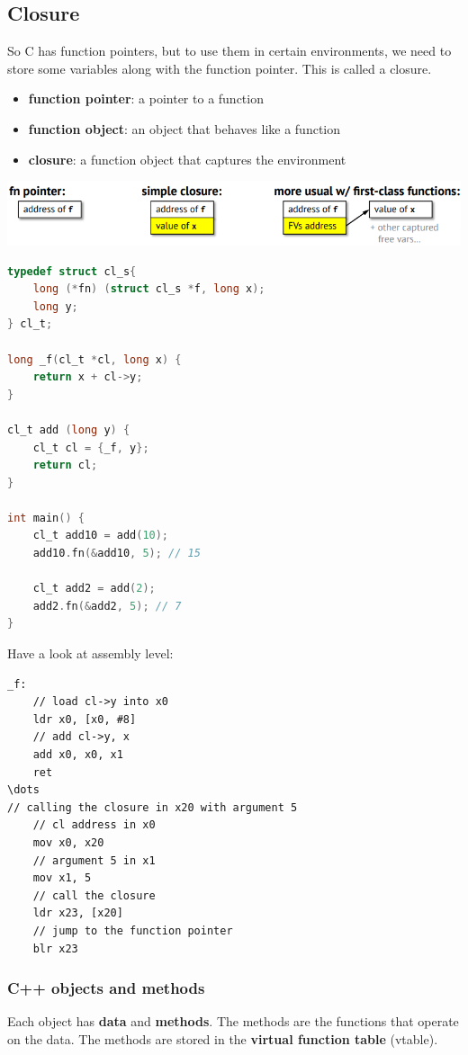 \documentclass[letterpaper,12pt]{article}
\begin{document}
\subsection{Closure}
So C has function pointers, but to use them in certain environments, we need to store some variables along with the function pointer. This is called a closure.
\begin{itemize}
    \item \textbf{function pointer}: a pointer to a function
    \item \textbf{function object}: an object that behaves like a function
    \item \textbf{closure}: a function object that captures the environment
\end{itemize}
\includegraphics*[scale=0.7]{./Images/C closures example.png}
\begin{lstlisting}[language=C]
typedef struct cl_s{
    long (*fn) (struct cl_s *f, long x);
    long y;
} cl_t;

long _f(cl_t *cl, long x) {
    return x + cl->y;
}

cl_t add (long y) {
    cl_t cl = {_f, y};
    return cl;
}

int main() {
    cl_t add10 = add(10);
    add10.fn(&add10, 5); // 15

    cl_t add2 = add(2);
    add2.fn(&add2, 5); // 7
}
\end{lstlisting}
Have a look at assembly level:
\begin{lstlisting}
_f:
    // load cl->y into x0
    ldr x0, [x0, #8]
    // add cl->y, x
    add x0, x0, x1
    ret
\dots
// calling the closure in x20 with argument 5
    // cl address in x0
    mov x0, x20
    // argument 5 in x1
    mov x1, 5
    // call the closure
    ldr x23, [x20]
    // jump to the function pointer
    blr x23
\end{lstlisting}

\subsubsection{C++ objects and methods}
Each object has \textbf{data} and \textbf{methods}. The methods are the functions that operate on the data. The methods are stored in the \textbf{virtual function table} (vtable).
\end{document}
